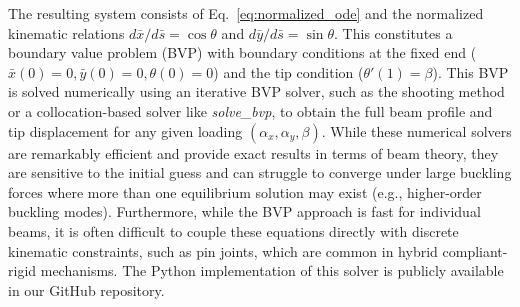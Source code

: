 \documentclass[colorlinks,upint,subscriptcorrection,varvw,hyphenate,balance]{asmeconf} %
\newcommand{\xbar}{\bar{x}}
\newcommand{\ybar}{\bar{y}}
\newcommand{\sbar}{\bar{s}}
\begin{document}
The resulting system consists of Eq.~\eqref{eq:normalized_ode} and the normalized kinematic relations $d\xbar/d\sbar = \cos\theta$ and $d\ybar/d\sbar = \sin\theta$. This constitutes a boundary value problem (BVP) with boundary conditions at the fixed end ($\xbar(0)=0, \ybar(0)=0, \theta(0)=0$) and the tip condition ($\theta'(1)=\beta$). This BVP is solved numerically using an iterative BVP solver, such as the shooting method or a collocation-based solver like \textit{solve\_bvp}, to obtain the full beam profile and tip displacement for any given loading $(\alpha_x, \alpha_y, \beta)$. While these numerical solvers are remarkably efficient and provide exact results in terms of beam theory, they are sensitive to the initial guess and can struggle to converge under large buckling forces where more than one equilibrium solution may exist (e.g., higher-order buckling modes). Furthermore, while the BVP approach is fast for individual beams, it is often difficult to couple these equations directly with discrete kinematic constraints, such as pin joints, which are common in hybrid compliant-rigid mechanisms. The Python implementation of this solver is publicly available in our GitHub repository.
\end{document}
